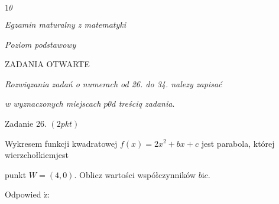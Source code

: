 \documentclass[a4paper,12pt]{article}
\begin{document}
$ 1\theta$

{\it Egzamin maturalny z matematyki}

{\it Poziom podstawowy}

ZADANIA OTWARTE

{\it Rozwiqzania zadań o numerach od 26. do 34. nalezy zapisać}

{\it w wyznaczonych miejscach} $p\theta d$ {\it treściq zadania}.

Zadanie 26. $(2pkt)$

Wykresem funkcji kwadratowej $f(x)=2x^{2}+bx+c$ jest parabola, której wierzchołkiemjest

punkt $W=(4,0)$. Oblicz wartości współczynników $b\mathrm{i}c.$

Odpowied $\acute{\mathrm{z}}$:
\end{document}
